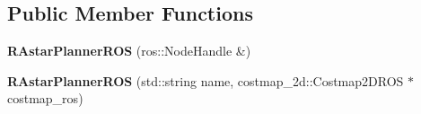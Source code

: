 \subsection*{Public Member Functions}
\begin{DoxyCompactItemize}
\item 
{\bfseries R\+Astar\+Planner\+R\+OS} (ros\+::\+Node\+Handle \&)\hypertarget{class_r_astar__planner_1_1_r_astar_planner_r_o_s_a7ab03997ec15cc3f6ad7bf9969ba8a5d}{}\label{class_r_astar__planner_1_1_r_astar_planner_r_o_s_a7ab03997ec15cc3f6ad7bf9969ba8a5d}

\item 
{\bfseries R\+Astar\+Planner\+R\+OS} (std\+::string name, costmap\+\_\+2d\+::\+Costmap2\+D\+R\+OS $\ast$costmap\+\_\+ros)\hypertarget{class_r_astar__planner_1_1_r_astar_planner_r_o_s_abc05123045762f13f17b45d0c491034b}{}\label{class_r_astar__planner_1_1_r_astar_planner_r_o_s_abc05123045762f13f17b45d0c491034b}


\end{DoxyCompactItemize}
